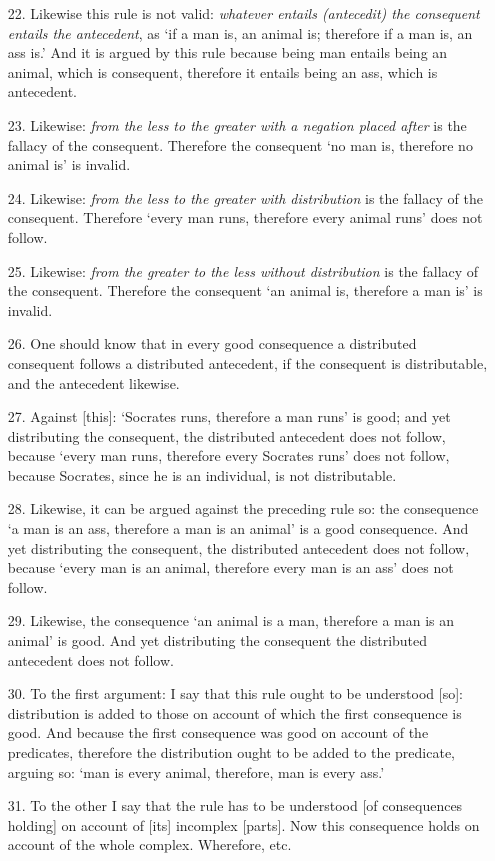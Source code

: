 \documentclass[]{article}
\begin{document}
\begin{itemize}
\item[22.] Likewise this rule is not valid: \textit{whatever entails (antecedit) the consequent entails the antecedent}, as `if a man is, an animal is; therefore if a man is, an ass is.' And it is argued by this rule because being man entails being an animal, which is consequent, therefore it entails being an ass, which is antecedent.
\item[23.] Likewise: \textit{from the less to the greater with a negation placed after} is the fallacy of the consequent. Therefore the consequent `no man is, therefore no animal is' is invalid.
\item[24.] Likewise: \textit{from the less to the greater with distribution} is the fallacy of the consequent. Therefore `every man runs, therefore every animal runs' does not follow.
\item[25.] Likewise: \textit{from the greater to the less without distribution} is the fallacy of the consequent. Therefore the consequent `an animal is, therefore a man is' is invalid.
\item[26.] One should know that in every good consequence a distributed consequent follows a distributed antecedent, if the consequent is distributable, and the antecedent likewise.
\item[27.] Against [this]: `Socrates runs, therefore a man runs' is good; and yet distributing the consequent, the distributed antecedent does not follow, because `every man runs, therefore every Socrates runs' does not follow, because Socrates, since he is an individual, is not distributable.
\item[28.] Likewise, it can be argued against the preceding rule so: the consequence `a man is an ass, therefore a man is an animal' is a good consequence. And yet distributing the consequent, the distributed antecedent does not follow, because `every man is an animal, therefore every man is an ass' does not follow.
\item[29.] Likewise, the consequence `an animal is a man, therefore a man is an animal' is good. And yet distributing the consequent the distributed antecedent does not follow.
\item[30.] To the first argument: I say that this rule ought to be understood [so]: distribution is added to those on account of which the first consequence is good. And because the first consequence was good on account of the predicates, therefore the distribution ought to be added to the predicate, arguing so: `man is every animal, therefore, man is every ass.'
\item[31.] To the other I say that the rule has to be understood [of consequences holding] on account of [its] incomplex [parts]. Now this consequence holds on account of the whole complex. Wherefore, etc.
\end{itemize}
\end{document}
